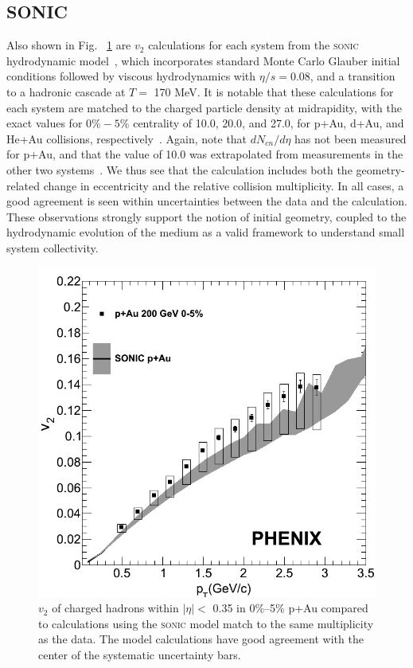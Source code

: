 \subsection{SONIC}
Also shown in Fig. ~\ref{fig:hydro_pau_alone} are $v_2$ calculations for each system from the \textsc{sonic} hydrodynamic model~\cite{Habich:2014jna}, which incorporates standard Monte Carlo Glauber initial conditions followed by viscous hydrodynamics with $\eta/s=0.08$, and a transition to a  hadronic cascade at $T=$ 170 MeV. It is notable that these calculations for each system are matched to the charged particle density at midrapidity, with the exact values for $0\%-5\%$ centrality of 10.0, 20.0, and 27.0, for p+Au, d+Au, and He+Au collisions, respectively~\cite{Habich:2014jna}. Again, note that $dN_{cn}/d\eta$ has not been measured for p+Au, and that the value of 10.0 was extrapolated from measurements in the other two systems~\cite{Habich:2014jna}. We thus see that the calculation includes both the geometry-related change in eccentricity and the relative collision multiplicity. In all cases, a good agreement is seen within uncertainties between the data and the calculation. These observations strongly support the notion of initial geometry, coupled to the hydrodynamic evolution of the medium as a valid framework to understand small system collectivity.

\begin{figure}
\begin{center}
\includegraphics[width=0.75\linewidth]{figs/pau_sonic_alone.png}
\caption{$v_2$ of charged hadrons within $|\eta| <$ 0.35 in 0\%--5\% p+Au compared to calculations using the \textsc{sonic} model match to the same multiplicity as the data. The model calculations have good agreement with the center of the systematic uncertainty bars.}
\label{fig:hydro_pau_alone}
\end{center}
\end{figure}

